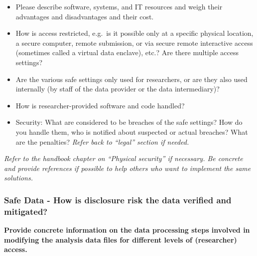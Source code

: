 \documentclass[
]{book}
\providecommand{\tightlist}{%
  \setlength{\itemsep}{0pt}\setlength{\parskip}{0pt}}
\begin{document}
\begin{itemize}
\tightlist
\item
  Please describe software, systems, and IT resources and weigh their advantages and disadvantages and their cost.
\item
  How is access restricted, e.g.~is it possible only at a specific physical location, a secure computer, remote submission, or via secure remote interactive access (sometimes called a virtual data enclave), etc.? Are there multiple access settings?
\item
  Are the various safe settings only used for researchers, or are they also used internally (by staff of the data provider or the data intermediary)?
\item
  How is researcher-provided software and code handled?
\item
  Security: What are considered to be breaches of the safe settings? How do you handle them, who is notified about suspected or actual breaches? What are the penalties? \emph{Refer back to ``legal'' section if needed.}
\end{itemize}

\emph{Refer to the handbook chapter on ``Physical security'' if necessary. Be concrete and provide references if possible to help others who want to implement the same solutions.}

\hypertarget{safe-data---how-is-disclosure-risk-the-data-verified-and-mitigated}{%
\subsubsection*{Safe Data - How is disclosure risk the data verified and mitigated?}\label{safe-data---how-is-disclosure-risk-the-data-verified-and-mitigated}}

\textbf{Provide concrete information on the data processing steps involved in modifying the analysis data files for different levels of (researcher) access.}
\end{document}
